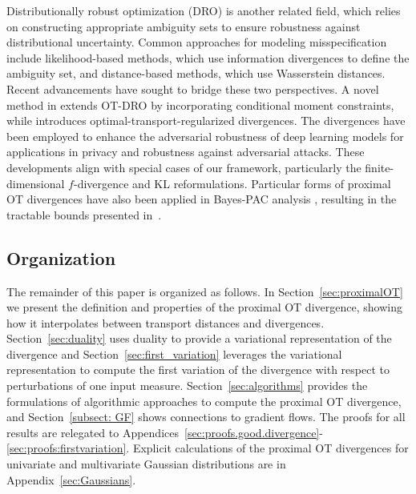 \documentclass{amsart}
\newcommand{\rb}[1]{#1} %
\theoremstyle{definition}
\theoremstyle{remark}
\numberwithin{equation}{section}
\begin{document}
Distributionally robust optimization (DRO) \cite{rahimian2022frameworks} is another related field, which relies on constructing appropriate ambiguity sets to ensure robustness against distributional uncertainty. Common approaches for modeling misspecification include likelihood-based methods, which use information divergences to define the ambiguity set, and distance-based methods, which use Wasserstein distances. Recent advancements have sought to bridge these two perspectives. A novel method in \cite{blanchet2023unifying} extends OT-DRO by incorporating conditional moment constraints, while \cite{birrell2023adversarially} introduces optimal-transport-regularized divergences. The divergences have been employed to enhance the adversarial robustness of deep learning models for applications in privacy and robustness against adversarial attacks. These developments align with special cases of our framework, particularly the finite-dimensional $f$-divergence and KL reformulations. Particular forms of proximal OT divergences have also been applied in Bayes-PAC analysis \cite{guedj2019primer}, resulting in the tractable bounds presented in~\cite{viallard2024tighter_PACBayes}.

\subsection{Organization}
\rb{The remainder of this paper is organized as follows. In Section~\ref{sec:proximalOT} we present the definition and properties of the proximal OT divergence, showing how it interpolates between transport distances and divergences. Section~\ref{sec:duality} uses duality to provide a variational representation of the divergence and Section~\ref{sec:first_variation} leverages the variational representation to compute the first variation of the divergence with respect to perturbations of one input measure. Section~\ref{sec:algorithms} provides the formulations of algorithmic approaches to compute the proximal OT divergence, and Section~\ref{subsect: GF} shows connections to gradient flows. The proofs for all results are relegated to Appendices~\ref{sec:proofs.good.divergence}-\ref{sec:proofs:firstvariation}. Explicit calculations of the proximal OT divergences for univariate and multivariate Gaussian distributions are in Appendix~\ref{sec:Gaussians}.}
\medskip
\end{document}
